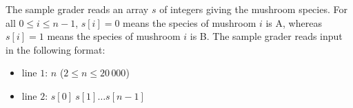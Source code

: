 The sample grader reads an array $s$ of integers giving the mushroom species. For all $0 \leq i \leq n-1$, $s[i] = 0$ means the species of mushroom $i$ is A, whereas $s[i] = 1$ means the species of mushroom $i$ is B. The sample grader reads input in the following format:
\begin{itemize}
\item line $1$: $n$ ($2 \leq n \leq 20\,000$)
\item line $2$: $s[0]\ s[1] \ldots s[n-1]$
\end{itemize}